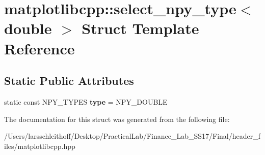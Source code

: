 \hypertarget{structmatplotlibcpp_1_1select__npy__type_3_01double_01_4}{}\section{matplotlibcpp\+:\+:select\+\_\+npy\+\_\+type$<$ double $>$ Struct Template Reference}
\label{structmatplotlibcpp_1_1select__npy__type_3_01double_01_4}
\subsection*{Static Public Attributes}
\begin{DoxyCompactItemize}
\item 
\mbox{\label{structmatplotlibcpp_1_1select__npy__type_3_01double_01_4_a939edaf81fedb879c8c90ad13c98a709}} 
static const N\+P\+Y\+\_\+\+T\+Y\+P\+ES {\bfseries type} = N\+P\+Y\+\_\+\+D\+O\+U\+B\+LE
\end{DoxyCompactItemize}


The documentation for this struct was generated from the following file\+:\begin{DoxyCompactItemize}
\item 
/\+Users/larsschleithoff/\+Desktop/\+Practical\+Lab/\+Finance\+\_\+\+Lab\+\_\+\+S\+S17/\+Final/header\+\_\+files/matplotlibcpp.\+hpp\end{DoxyCompactItemize}
